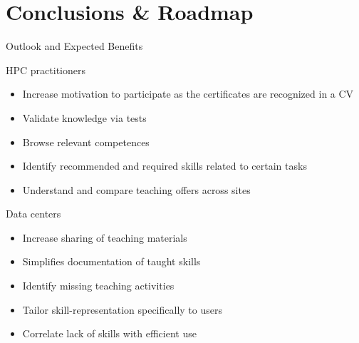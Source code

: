 \documentclass[compress,aspectratio=169]{beamer}
\begin{document}
\section{Conclusions \& Roadmap}
\sectionIntroHidden

\begin{frame}{Outlook and Expected Benefits}
	\begin{block}{HPC practitioners}
		\vspace*{-0.2cm}
	\begin{itemize}
	\item Increase motivation to participate as the certificates are recognized in a CV
	\item Validate knowledge via tests
	\item Browse relevant competences
	\item Identify recommended and required skills related to certain tasks
	\item Understand and compare teaching offers across sites
	\end{itemize}
	\end{block}
	\vspace*{-0.3cm}
	\begin{block}{Data centers}
		\vspace*{-0.2cm}
	\begin{itemize}
	\item Increase sharing of teaching materials
	\item Simplifies documentation of taught skills
	\item Identify missing teaching activities
	\item Tailor skill-representation specifically to users
	\item Correlate lack of skills with efficient use
	\end{itemize}
	\end{block}
\end{frame}
\end{document}
